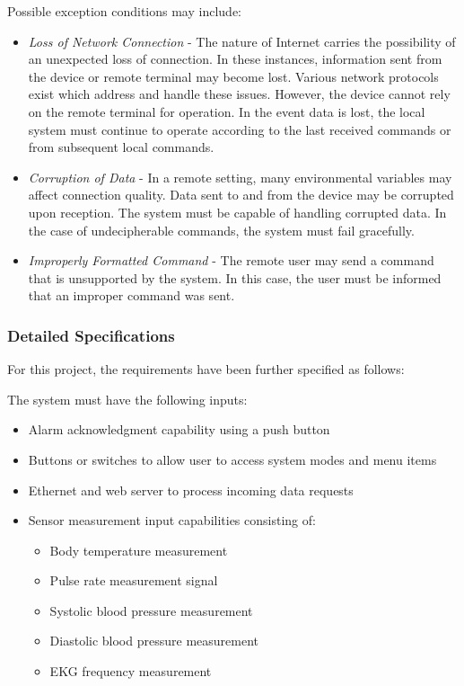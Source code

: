 \documentclass[12pt]{article} %
\begin{document}
Possible exception conditions may include:
\begin{itemize}
	\item \emph{Loss of Network Connection} - The nature of Internet carries the
		possibility of an unexpected loss of connection. In these instances,
		information sent from the device or remote terminal may become lost.
		Various network protocols exist which address and handle these
		issues. However, the device cannot rely on the remote terminal for
		operation. In the event data is lost, the local system must
		continue to operate according to the last received commands or from
		subsequent local commands.
	\item \emph{Corruption of Data} - In a remote setting, many environmental
		variables may affect connection quality. Data sent to and from the device
		may be corrupted upon reception. The system must be capable of handling
		corrupted data. In the case of undecipherable commands, the system must
		fail gracefully.
	\item \emph{Improperly Formatted Command} - The remote user may send a
		command that is unsupported by the system. In this case, the user must be
		informed that an improper command was sent.
\end{itemize}


\subsubsection{Detailed Specifications }
For this project, the requirements have been further specified as follows:

\begin{itemize}[$$]
	\item The system must have the following inputs:
		\begin{itemize}[$\bullet$]
			\item Alarm acknowledgment capability using a push button
			\item Buttons or switches to allow user to access system modes and menu items
			\item Ethernet and web server to process incoming data requests
			\item Sensor measurement input capabilities consisting of:
				\begin{itemize}
					\item Body temperature measurement
					\item Pulse rate measurement signal
					\item Systolic blood pressure measurement
					\item Diastolic blood pressure measurement
					\item EKG frequency measurement
				\end{itemize}
    \end{itemize}
\end{itemize}
\end{document}

